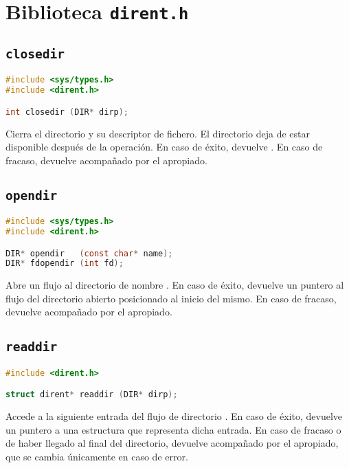 \chapter{Biblioteca \texttt{dirent.h}}

\section{\texttt{closedir}}\label{closedir}

\begin{lstlisting}[language=C]
#include <sys/types.h>
#include <dirent.h>

int closedir (DIR* dirp);
\end{lstlisting}

Cierra el directorio  y su descriptor de fichero.
El directorio deja de estar disponible después de la operación.
En caso de éxito, devuelve .
En caso de fracaso, devuelve  acompañado por el  apropiado.

\section{\texttt{opendir}}\label{opendir}

\begin{lstlisting}[language=C]
#include <sys/types.h>
#include <dirent.h>

DIR* opendir   (const char* name);
DIR* fdopendir (int fd);
\end{lstlisting}

Abre un flujo al directorio de nombre .
En caso de éxito, devuelve un puntero al flujo del directorio abierto posicionado al inicio del mismo.
En caso de fracaso, devuelve  acompañado por el  apropiado.

\section{\texttt{readdir}}\label{readdir}

\begin{lstlisting}[language=C]
#include <dirent.h>

struct dirent* readdir (DIR* dirp);
\end{lstlisting}

Accede a la siguiente entrada del flujo de directorio .
En caso de éxito, devuelve un puntero a una estructura  que representa dicha entrada.
En caso de fracaso o de haber llegado al final del directorio, devuelve  acompañado por el  apropiado, que se cambia únicamente en caso de error.

